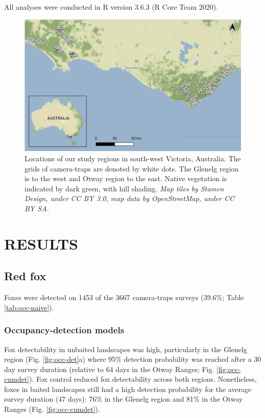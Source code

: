 \documentclass[]{elsarticle} %
\begin{document}
All analyses were conducted in R version 3.6.3 (R Core Team 2020).

\newpage

\begin{figure}

{\centering \includegraphics[width=0.8\linewidth]{../figs/map_cams} 

}

\caption{Locations of our study regions in south-west Victoria, Australia. The grids of camera-traps are denoted by white dots. The Glenelg region is to the west and Otway region to the east. Native vegetation is indicated by dark green, with hill shading. \textit{Map tiles by Stamen Design, under CC BY 3.0, map data by OpenStreetMap, under CC BY SA.}}\label{fig:occ-map}
\end{figure}

\newpage

\hypertarget{results}{%
\section{RESULTS}\label{results}}

\hypertarget{red-fox}{%
\subsection{Red fox}\label{red-fox}}

Foxes were detected on 1453 of the 3667 camera-traps surveys (39.6\%; Table \ref{tab:occ-naive}).

\hypertarget{occupancy-detection-models-1}{%
\subsubsection{Occupancy-detection models}\label{occupancy-detection-models-1}}

Fox detectability in unbaited landscapes was high, particularly in the Glenelg region (Fig. \ref{fig:occ-det}a) where 95\% detection probability was reached after a 30 day survey duration (relative to 64 days in the Otway Ranges; Fig. \ref{fig:occ-cumdet}). Fox control reduced fox detectability across both regions. Nonetheless, foxes in baited landscapes still had a high detection probability for the average survey duration (47 days): 76\% in the Glenelg region and 81\% in the Otway Ranges (Fig. \ref{fig:occ-cumdet}).
\end{document}
